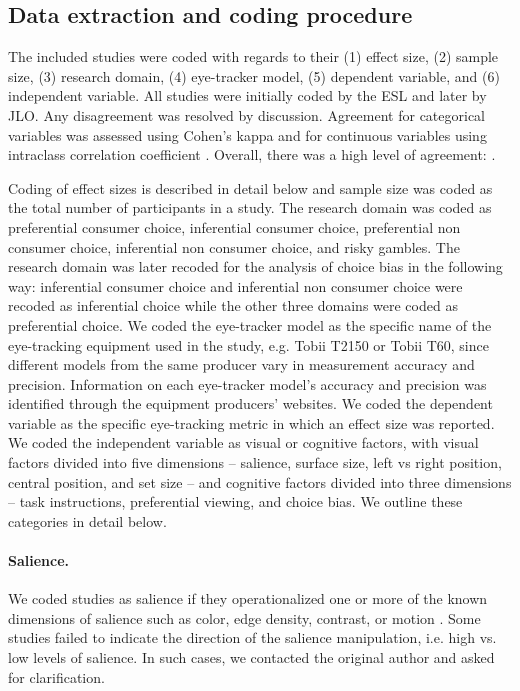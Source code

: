 \documentclass[english,natbib,man,floatsintext]{apa6}
\begin{document}
\subsection{Data extraction and coding procedure}

The included studies were coded with regards to their (1) effect size, (2) sample size, (3) research domain, (4) eye-tracker model, (5) dependent variable, and (6) independent variable. All studies were initially coded by the ESL and later by JLO. Any disagreement was resolved by discussion. Agreement for categorical variables was assessed using Cohen's kappa and for continuous variables using intraclass correlation coefficient \citep{shrout1979a}. Overall, there was a high level of agreement: .

Coding of effect sizes is described in detail below and sample size was coded as the total number of participants in a study. The research domain was coded as preferential consumer choice, inferential consumer choice, preferential non consumer choice, inferential non consumer choice, and risky gambles. The research domain was later recoded for the analysis of choice bias in the following way: inferential consumer choice and inferential non consumer choice were recoded as inferential choice while the other three domains were coded as preferential choice. We coded the eye-tracker model as the specific name of the eye-tracking equipment used in the study, e.g. Tobii T2150 or Tobii T60, since different models from the same producer vary in measurement accuracy and precision. Information on each eye-tracker model's accuracy and precision was identified through the equipment producers' websites. We coded the dependent variable as the specific eye-tracking metric in which an effect size was reported. We coded the independent variable as visual or cognitive factors, with visual factors divided into five dimensions -- salience, surface size, left vs right position, central position, and set size -- and cognitive factors divided into three dimensions -- task instructions, preferential viewing, and choice bias. We outline these categories in detail below. 

\paragraph{Salience.} We coded studies as salience if they operationalized one or more of the known dimensions of salience such as color, edge density, contrast, or motion \citep{itti2000}. Some studies failed to indicate the direction of the salience manipulation, i.e. high vs. low levels of salience. In such cases, we contacted the original author and asked for clarification.
\end{document}
